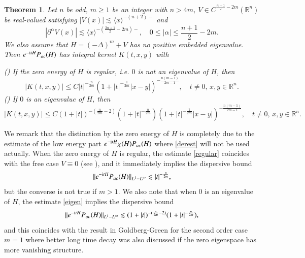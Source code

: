 \documentclass[11pt,reqno]{amsart}
\def\i{{\rm i}}
\newtheorem{theorem}{Theorem}[section]
\numberwithin{equation}{section}
\theoremstyle{definition}
\begin{document}
\begin{theorem}\label{thmmain}
	Let $n$ be odd, $m\geq1$ be an integer with $n>4m$, $V\in C^{\frac{n+1}{2}-2m}(\mathbb{R}^n)$ be real-valued satisfying $|V(x)|\lesssim\langle x\rangle^{-(n+2)-}$ and
	\begin{equation}\label{derest}
		|\partial^\alpha V(x)|\lesssim\langle x\rangle^{-(\frac{3n+1}{2}-2m)-},\quad0\leq|\alpha|\leq\mbox{$\frac{n+1}{2}-2m$}.
	\end{equation}
	We also assume that $H=(-\Delta)^m+V$ has no positive embedded eigenvalue. Then $e^{-\i tH}P_{ac}(H)$ has integral kernel $K(t,x,y)$ with
	
	\noindent() If the zero energy of $H$ is regular, i.e. $0$ is not an eigenvalue of $H$, then
	\begin{equation}\label{regular}
		|K(t, x,y)|\le C|t|^{-\frac{n}{2 m}}\left(1+|t|^{-\frac{1}{2 m}}|x-y|\right)^{-\frac{n(m-1)}{2 m-1}},\quad t\neq0,\,x,y\in\mathbb{R}^n.
	\end{equation}
\noindent() If $0$ is an eigenvalue of $H$, then
\begin{equation}\label{eigen}
	|K(t, x,y)|\le C(1+|t|)^{-(\frac{n}{2m}-2)}(1+|t|^{-\frac{n}{2 m}})\left(1+|t|^{-\frac{1}{2 m}}|x-y|\right)^{-\frac{n(m-1)}{2 m-1}},\quad t\neq0,\,x,y\in\mathbb{R}^n.
\end{equation}
\end{theorem}

We remark that the distinction by the zero energy of $H$ is completely due to the estimate of the low energy part $e^{-\i tH}\chi(H)P_{ac}(H)$ where \eqref{derest} will not be used actually. When the zero energy of $H$ is regular, the estimate \eqref{regular} coincides with the free case $V\equiv0$ (see \cite{Mi}), and it immediately implies the dispersive bound
\begin{equation}\label{highdispersive}
	\|e^{-\i tH}P_{ac}(H)\|_{L^1-L^\infty}\lesssim|t|^{-\frac{n}{2m}},
\end{equation}
but the converse is not true if $m>1$. We also note that when $0$ is an eigenvalue of $H$, the estimate \eqref{eigen} implies the dispersive bound
\begin{equation*}
	\|e^{-\i tH}P_{ac}(H)\|_{L^1-L^\infty}\lesssim(1+|t|)^{-(\frac{n}{2m}-2)}(1+|t|^{-\frac{n}{2 m}}),
\end{equation*}
and this coincides with the result in Goldberg-Green \cite{GG15} for the second order case $m=1$ where better long time decay was also discussed if the zero eigenspace has more vanishing structure.
\end{document}
